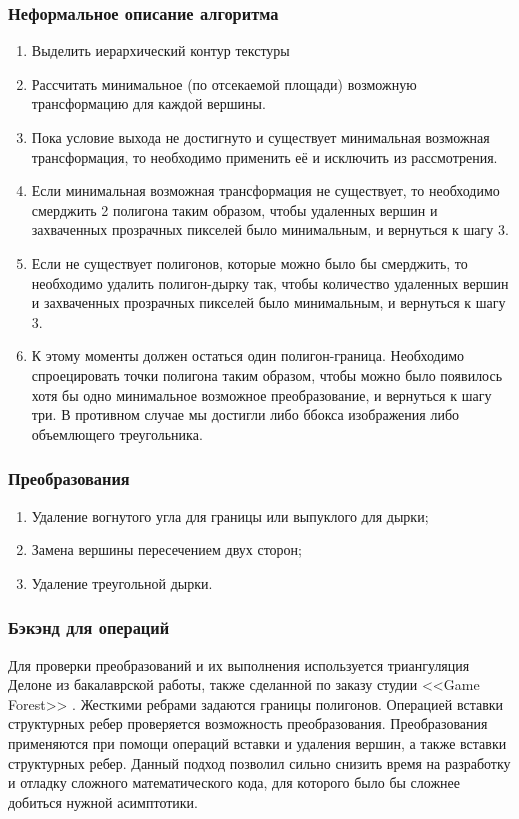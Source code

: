 \documentclass{fefu_thesis/cls/fefu}
\begin{document}
    \subsubsection{Неформальное описание алгоритма}
        \begin{enumerate}
            \item Выделить иерархический контур текстуры
            \item Рассчитать минимальное (по отсекаемой площади) возможную трансформацию для каждой вершины.
            \item Пока условие выхода не достигнуто и существует минимальная возможная трансформация, то необходимо применить её и исключить из рассмотрения.
            \item Если минимальная возможная трансформация не существует, то необходимо смерджить 2 полигона таким образом, чтобы удаленных вершин и захваченных прозрачных пикселей было минимальным, и вернуться к шагу 3.
            \item Если не существует полигонов, которые можно было бы смерджить, то необходимо удалить полигон-дырку так, чтобы количество удаленных вершин и захваченных прозрачных пикселей было минимальным, и вернуться к шагу 3.
            \item К этому моменты должен остаться один полигон-граница. Необходимо спроецировать точки полигона таким образом, чтобы можно было появилось хотя бы одно минимальное возможное преобразование, и вернуться к шагу три. В противном случае мы достигли либо ббокса изображения либо объемлющего треугольника.
        \end{enumerate}

    \subsubsection{Преобразования}
        \begin{enumerate}
            \item Удаление вогнутого угла для границы или выпуклого для дырки;
            \item Замена вершины пересечением двух сторон;
            \item Удаление треугольной дырки.
        \end{enumerate}
    \subsubsection{Бэкэнд для операций}
    Для проверки преобразований и их выполнения используется триангуляция Делоне\cite{Delaunay} из бакалаврской работы, также сделанной по заказу студии <<Game Forest>> . Жесткими ребрами задаются границы полигонов. Операцией вставки структурных ребер проверяется возможность преобразования. Преобразования применяются при помощи операций вставки и удаления вершин, а также вставки структурных ребер. Данный подход позволил сильно снизить время на разработку и отладку сложного математического кода, для которого было бы сложнее добиться нужной асимптотики.
\end{document}
